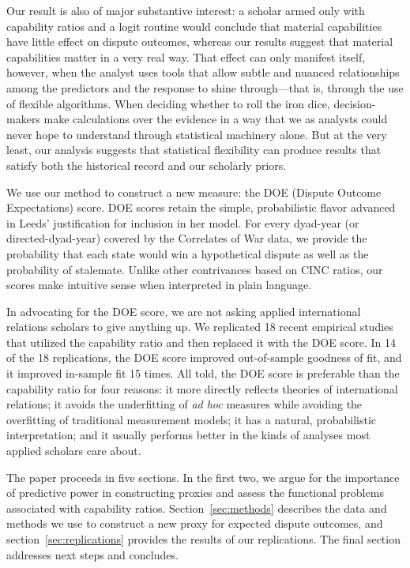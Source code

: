 Our result is also of major substantive interest:  a scholar armed only with capability ratios and a logit routine would conclude that material capabilities have little effect on dispute outcomes, whereas our results suggest that material capabilities matter in a very real way.  That effect can only manifest itself, however, when the analyst uses tools that allow subtle and nuanced relationships among the predictors and the response to shine through---that is, through the use of flexible algorithms.  When deciding whether to roll the iron dice, decision-makers make calculations over the evidence in a way that we as analysts could never hope to understand through statistical machinery alone.  But at the very least, our analysis suggests that statistical flexibility can produce results that satisfy both the historical record and our scholarly priors.

We use our method to construct a new measure:  the DOE (Dispute Outcome Expectations) score.  DOE scores retain the simple, probabilistic flavor advanced in Leeds' justification for inclusion in her model.
For every dyad-year (or directed-dyad-year) covered by the Correlates of War data, we provide the probability that each state would win a hypothetical dispute as well as the probability of stalemate.
Unlike other contrivances based on CINC ratios, our scores make intuitive sense when interpreted in plain language.

In advocating for the DOE score, we are not asking applied international relations scholars to give anything up.
We replicated 18 recent empirical studies that utilized the capability ratio and then replaced it with the DOE score.
In 14 of the 18 replications, the DOE score improved out-of-sample goodness of fit, and it improved in-sample fit 15 times.
All told, the DOE score is preferable than the capability ratio for four reasons: it more directly reflects theories of international relations; it avoids the underfitting of \emph{ad hoc} measures while avoiding the overfitting of traditional measurement models; it has a natural, probabilistic interpretation; and it usually performs better in the kinds of analyses most applied scholars care about.

The paper proceeds in five sections.
In the first two, we argue for the importance of predictive power in constructing proxies and assess the functional problems associated with capability ratios.
Section~\ref{sec:methods} describes the data and methods we use to construct a new proxy for expected dispute outcomes, and section~\ref{sec:replications} provides the results of our replications.
The final section addresses next steps and concludes.

